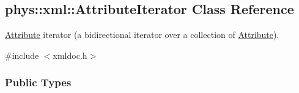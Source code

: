 \hypertarget{classphys_1_1xml_1_1AttributeIterator}{
\subsection{phys::xml::AttributeIterator Class Reference}
\label{de/d78/classphys_1_1xml_1_1AttributeIterator}
}


\hyperlink{classphys_1_1xml_1_1Attribute}{Attribute} iterator (a bidirectional iterator over a collection of \hyperlink{classphys_1_1xml_1_1Attribute}{Attribute}).  




{\ttfamily \#include $<$xmldoc.h$>$}

\subsubsection*{Public Types}
